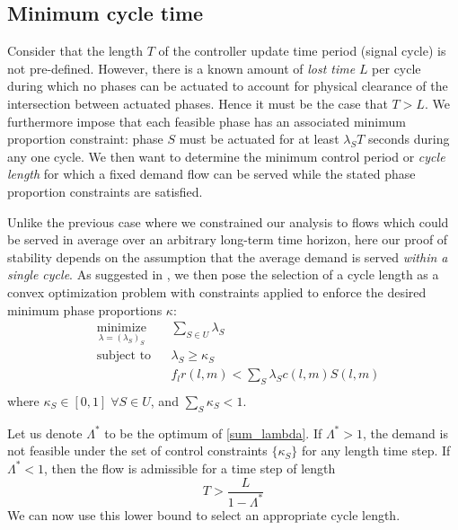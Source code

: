 \subsection*{Minimum cycle time}
Consider that the length $T$ of the controller update time period (signal cycle) is not pre-defined. However, there is a known amount of \emph{lost time} $L$ per cycle during which no phases can be actuated to account for physical clearance of the intersection between actuated phases. Hence it must be the case that $T>L$.  We furthermore impose that each feasible phase has an associated minimum proportion constraint: phase $S$ must be actuated for at least $\lambda_S T$ seconds during any one cycle. We then want to determine the minimum control period or \emph{cycle length} for which a fixed demand flow can be served while the stated phase proportion constraints are satisfied. 

Unlike the previous case where we constrained our analysis to flows which could be served in average over an arbitrary long-term time horizon, here our proof of stability depends on the assumption that the average demand is served \textit{within a single cycle}. As suggested in \cite{MaxPressureStochastic}, we then pose the selection of a cycle length as a convex optimization problem with constraints applied to enforce the desired minimum phase proportions $\kappa$:
\begin{equation} \label{sum_lambda}
\begin{aligned}
& \underset{\lambda = (\lambda_{S})_{S}}{\text{minimize}}
& & \sum_{S\in U} \lambda_{S} \\
& \text{subject to}
& &  \lambda_{S} \geq \kappa_S\\
&&& f_{l}r(l,m) < \sum_{S}\lambda_{S} c(l,m)S(l,m)\\
\end{aligned}
\end{equation}
where $\kappa_S \in [0,1] \; \forall S\in U$, and $\sum_S \kappa_S <1$. 
%

Let us denote $\Lambda^{*}$ to be the optimum of  \eqref{sum_lambda}. If $\Lambda^* > 1$, the demand is not feasible under the set of control constraints $\{\kappa_S\}$ for any length time step. If $\Lambda^* < 1$, then the flow is admissible for a time step of length 
\begin{equation} T > \frac{L}{1-\Lambda^*} \label{minTime} \end{equation} 
We can now use this lower bound to select an appropriate cycle length. 


